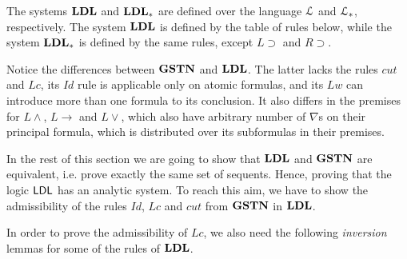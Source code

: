 The systems $\mathbf{LDL}$ and $\mathbf{LDL}_*$ are defined over the language $\mathcal{L}$ and $\mathcal{L}_*$, respectively. The system $\mathbf{LDL}$ is defined by the table of rules below, while the system $\mathbf{LDL}_*$ is defined by the same rules, except $L \supset$ and $R \supset$.


Notice the differences between $\mathbf{GSTN}$ and $\mathbf{LDL}$. The latter lacks the rules $cut$ and $Lc$, its $Id$ rule is applicable only on atomic formulas, and its $Lw$ can introduce more than one formula to its conclusion. It also differs in the premises for $L \wedge$, $L \rightarrow$ and $L \vee$, which also have arbitrary number of $\nabla$s on their principal formula, which is distributed over its subformulas in their premises.

In the rest of this section we are going to show that $\mathbf{LDL}$ and $\mathbf{GSTN}$ are equivalent, i.e. prove exactly the same set of sequents. Hence, proving that the logic $\mathsf{LDL}$ has an analytic system. To reach this aim, we have to show the admissibility of the rules $Id$, $Lc$ and $cut$ from $\mathbf{GSTN}$ in $\mathbf{LDL}$.


In order to prove the admissibility of $Lc$, we also need the following \emph{inversion} lemmas for some of the rules of $\mathbf{LDL}$.

